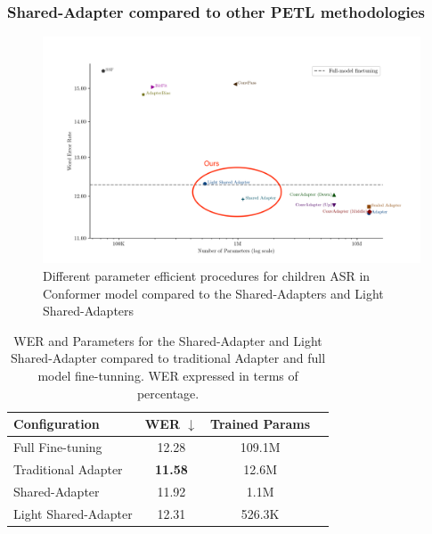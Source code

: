 \subsubsection{Shared-Adapter compared to other PETL methodologies}
\begin{figure}[h]
    \begin{center}
        \includegraphics[width=\textwidth]{imgs/Adapters_compare.png}
        \caption{Different parameter efficient procedures for children ASR in Conformer model compared to the Shared-Adapters and Light Shared-Adapters}
        \label{fig:adapter_compared}
    \end{center}
\end{figure}

\begin{table}[h]
    \centering
    \begin{tabular}{l c c c}
        \hline
        \textbf{Configuration} & \textbf{WER $\downarrow$} & \textbf{Trained Params} \\
        \hline
        Full Fine-tuning & 12.28 & 109.1M \\ \hline
        Traditional Adapter & \textbf{11.58} & 12.6M \\
        Shared-Adapter & 11.92 & 1.1M \\
        Light Shared-Adapter & 12.31 & 526.3K \\ \hline
    \end{tabular}
    \caption{WER and Parameters for the Shared-Adapter and Light Shared-Adapter compared to traditional Adapter and full model fine-tunning. WER expressed in terms of percentage.}
    \label{tab:shared_adapter_results1}
\end{table}

